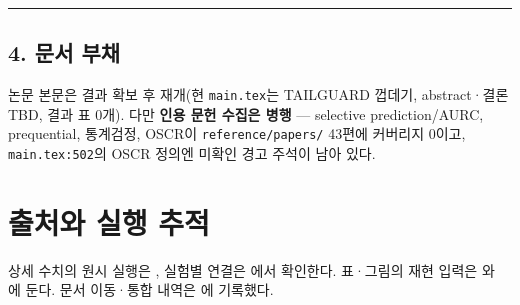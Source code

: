 \medskip\hrule\medskip
\subsection{4. 문서 부채}
논문 본문은 결과 확보 후 재개(현 \texttt{main.\allowbreak{}tex\allowbreak{}}는 TAILGUARD 껍데기, abstract·결론 TBD, 결과 표 0개). 다만 \textbf{인용 문헌 수집은 병행} — selective prediction/\allowbreak{}AURC, prequential, 통계검정, OSCR이 \texttt{referenc\allowbreak{}e/\allowbreak{}\allowbreak{}papers\allowbreak{}/\allowbreak{}\allowbreak{}} 43편에 커버리지 0이고, \texttt{main.\allowbreak{}tex\allowbreak{}:502}의 OSCR 정의엔 미확인 경고 주석이 남아 있다.



\section*{출처와 실행 추적}

상세 수치의 원시 실행은 , 실험별 연결은 에서 확인한다. 표·그림의 재현 입력은 와 에 둔다. 문서 이동·통합 내역은 에 기록했다.


